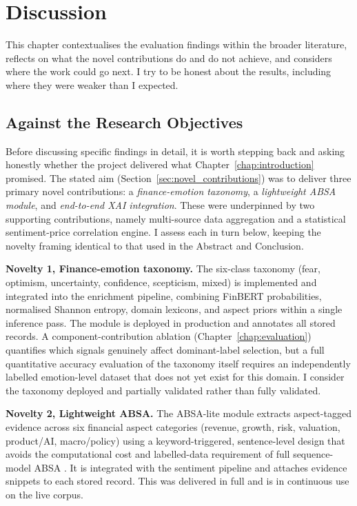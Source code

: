 \chapter{Discussion}
\label{chap:discussion}

This chapter contextualises the evaluation findings within the broader literature, reflects on what the novel contributions do and do not achieve, and considers where the work could go next. I try to be honest about the results, including where they were weaker than I expected.

\section{Against the Research Objectives}
\label{sec:against_objectives}

Before discussing specific findings in detail, it is worth stepping back and asking honestly whether the project delivered what Chapter~\ref{chap:introduction} promised. The stated aim (Section~\ref{sec:novel_contributions}) was to deliver three primary novel contributions: a \textit{finance-emotion taxonomy}, a \textit{lightweight ABSA module}, and \textit{end-to-end XAI integration}. These were underpinned by two supporting contributions, namely multi-source data aggregation and a statistical sentiment-price correlation engine. I assess each in turn below, keeping the novelty framing identical to that used in the Abstract and Conclusion.

\textbf{Novelty 1, Finance-emotion taxonomy.} The six-class taxonomy (fear, optimism, uncertainty, confidence, scepticism, mixed) is implemented and integrated into the enrichment pipeline, combining FinBERT probabilities, normalised Shannon entropy, domain lexicons, and aspect priors within a single inference pass. The module is deployed in production and annotates all stored records. A component-contribution ablation (Chapter~\ref{chap:evaluation}) quantifies which signals genuinely affect dominant-label selection, but a full quantitative accuracy evaluation of the taxonomy itself requires an independently labelled emotion-level dataset that does not yet exist for this domain. I consider the taxonomy deployed and partially validated rather than fully validated.

\textbf{Novelty 2, Lightweight ABSA.} The ABSA-lite module extracts aspect-tagged evidence across six financial aspect categories (revenue, growth, risk, valuation, product/AI, macro/policy) using a keyword-triggered, sentence-level design that avoids the computational cost and labelled-data requirement of full sequence-model ABSA \citep{pontiki2014semeval}. It is integrated with the sentiment pipeline and attaches evidence snippets to each stored record. This was delivered in full and is in continuous use on the live corpus.

